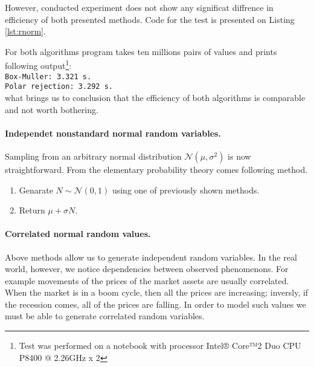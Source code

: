 \documentclass[a4paper,12pt, oneside]{book}
\theoremstyle{definition}
\theoremstyle{remark}
\begin{document}
However, conducted experiment does not show any significat diffrence in efficiency of both presented methods. Code for the test is presented on Listing \ref{lst:rnorm}.
\lstset{  basicstyle=\scriptsize }

For both algorithms program takes ten millions pairs of values and prints following \hbox{output}\footnote{Test was performed on a notebook with processor Intel® Core™2 Duo CPU P8400 @ 2.26GHz x 2 }: \bigskip \\
\texttt{Box-Muller: 3.321 s.\\
Polar rejection: 3.292 s.} \bigskip\\
what brings us to conclusion that the efficiency of both algorithms is comparable and not worth bothering.

\paragraph{Independet nonstandard normal random variables.} Sampling from an arbitrary normal distribution $\mathcal{N}(\mu, \sigma^2)$ is now straightforward. From the elementary probability theory comes following method.
\begin{enumerate}
 \item Genarate $N \sim \mathcal{N}(0,1)$ using one of previously shown methods.
 \item Return $\mu + \sigma N$.
\end{enumerate}

\paragraph{Correlated normal random values.} Above methods allow us to generate independent random variables. In the real world, however, we notice dependencies between observed phenomenons. For example movements of the prices of the market assets are usually correlated. When the market is in a boom cycle, then all the prices are increasing; inversly, if the recession comes, all of the prices are falling. In order to model such values we must be able to generate correlated random variables.
\end{document}

